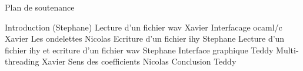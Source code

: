 Plan de soutenance

Introduction (Stephane)
Lecture d'un fichier wav {Xavier}
Interfacage ocaml/c {Xavier}
Les ondelettes {Nicolas}
Ecriture d'un fichier ihy {Stephane}
Lecture d'un fichier ihy et ecriture d'un fichier wav {Stephane}
Interface graphique {Teddy}
Multi-threading {Xavier}
Sens des coefficients {Nicolas}
Conclusion {Teddy}

